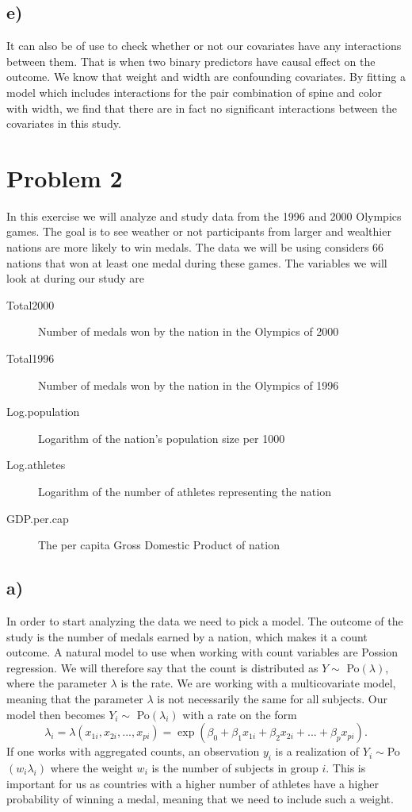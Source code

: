 \documentclass[a4paper, 10pt, reqno]{amsart}
\begin{document}
\subsection{e)}
It can also be of use to check whether or not our covariates have any interactions between them. That is when two binary predictors have causal effect on the outcome. We know that weight and width are confounding covariates. By fitting a model which includes interactions for the pair combination of spine and color with width, we find that there are in fact no significant interactions between the covariates in this study.

\section{Problem 2}
In this exercise we will analyze and study data from the 1996 and 2000 Olympics games. The goal is to see weather or not participants from larger and wealthier nations are more likely to win medals. The data we will be using considers 66 nations that won at least one medal during these games. The variables we will look at during our study are

\begin{description}
    \item[Total2000] Number of medals won by the nation in the Olympics of 2000
    \item[Total1996] Number of medals won by the nation in the Olympics of 1996
    \item[Log.population] Logarithm of the nation's population size per 1000
    \item[Log.athletes] Logarithm of the number of athletes representing the nation
    \item[GDP.per.cap] The per capita Gross Domestic Product of nation
\end{description}

\subsection{a)}
In order to start analyzing the data we need to pick a model. The outcome of the study is the number of medals earned by a nation, which makes it a count outcome. A natural model to use when working with count variables are Possion regression. We will therefore say that the count is distributed as $Y \sim $ Po$(\lambda)$, where the parameter $\lambda$ is the rate. We are working with a multicovariate model, meaning that the parameter $\lambda$ is not necessarily the same for all subjects. Our model then becomes $Y_i \sim$ Po$(\lambda_i)$ with a rate on the form
\begin{equation}
    \lambda_i = \lambda(x_{1i},x_{2i},...,x_{pi}) = \exp(\beta_0 + \beta_1 x_{1i} + \beta_2 x_{2i} + ... + \beta_p x_{pi}).
\end{equation}
If one works with aggregated counts, an observation $y_i$ is a realization of $Y_i \sim $Po$(w_i\lambda_i)$ where the weight $w_i$ is the number of subjects in group $i$. This is important for us as countries with a higher number of athletes have a higher probability of winning a medal, meaning that we need to include such a weight.
\end{document}
